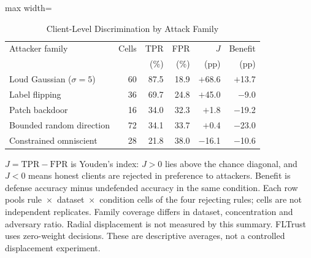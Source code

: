 \begin{table}[!t]
\centering\footnotesize
\setlength{\tabcolsep}{4pt}
\caption{Client-Level Discrimination by Attack Family}\label{tab:discrimination}
\begin{adjustbox}{max width=\columnwidth}
\begin{tabular}{lrrrrr}
\toprule
Attacker family & Cells & TPR & FPR & $J$ & Benefit \\
 &  & (\%) & (\%) & (pp) & (pp) \\
\midrule
Loud Gaussian ($\sigma=5$) & 60 & 87.5 & 18.9 & $+$68.6 & $+$13.7 \\
Label flipping & 36 & 69.7 & 24.8 & $+$45.0 & $-$9.0 \\
Patch backdoor & 16 & 34.0 & 32.3 & $+$1.8 & $-$19.2 \\
Bounded random direction & 72 & 34.1 & 33.7 & $+$0.4 & $-$23.0 \\
Constrained omniscient & 28 & 21.8 & 38.0 & $-$16.1 & $-$10.6 \\
\bottomrule
\end{tabular}
\end{adjustbox}

\par\vspace{3pt}\parbox{\linewidth}{\footnotesize $J=\mathrm{TPR}-\mathrm{FPR}$ is Youden's index: $J>0$ lies above the chance diagonal, and $J<0$ means honest clients are rejected in preference to attackers. Benefit is defense accuracy minus undefended accuracy in the same condition. Each row pools rule~$\times$~dataset~$\times$~condition cells of the four rejecting rules; cells are not independent replicates. Family coverage differs in dataset, concentration and adversary ratio. Radial displacement is not measured by this summary. FLTrust uses zero-weight decisions. These are descriptive averages, not a controlled displacement experiment.}
\end{table}
